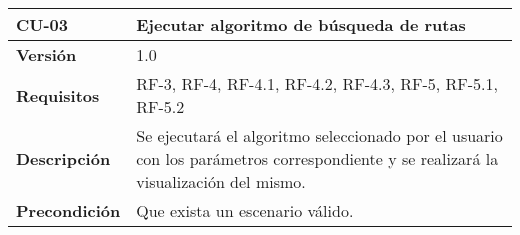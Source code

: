 \begin{longtable}[H]{@{}ll@{}}
\toprule
\begin{minipage}[b]{0.23\columnwidth}\raggedright\strut
\textbf{CU-03}\strut
\end{minipage} & \begin{minipage}[b]{0.71\columnwidth}\raggedright\strut
\textbf{Ejecutar algoritmo de búsqueda de rutas}\strut
\end{minipage}\tabularnewline
\midrule
\endhead

\begin{minipage}[t]{0.23\columnwidth}\raggedright\strut
\textbf{Versión}\strut
\end{minipage} & \begin{minipage}[t]{0.71\columnwidth}\raggedright\strut
1.0\strut
\end{minipage}\tabularnewline

\begin{minipage}[t]{0.23\columnwidth}\raggedright\strut
\textbf{Requisitos}\strut
\end{minipage} & \begin{minipage}[t]{0.71\columnwidth}\raggedright\strut
RF-3, RF-4, RF-4.1, RF-4.2, RF-4.3, RF-5, RF-5.1, RF-5.2\strut
\end{minipage}\tabularnewline

\begin{minipage}[t]{0.23\columnwidth}\raggedright\strut
\textbf{Descripción}\strut
\end{minipage} & \begin{minipage}[t]{0.71\columnwidth}\raggedright\strut
Se ejecutará el algoritmo seleccionado por el usuario con los parámetros correspondiente y se realizará la visualización del mismo.\strut
\end{minipage}\tabularnewline

\begin{minipage}[t]{0.23\columnwidth}\raggedright\strut
\textbf{Precondición}\strut
\end{minipage} & \begin{minipage}[t]{0.71\columnwidth}\raggedright\strut Que exista un escenario válido.\strut
\end{minipage}\tabularnewline


\end{longtable}

